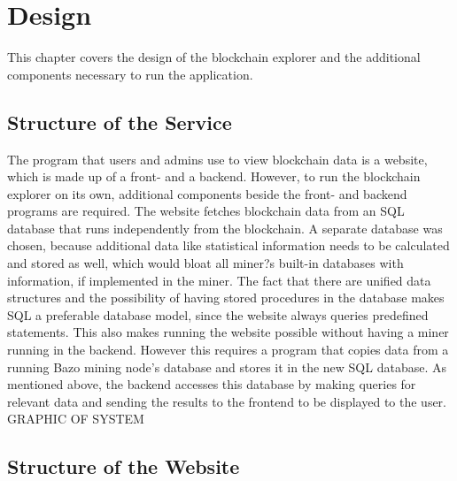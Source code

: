 \chapter{Design} \label{chap:design}
This chapter covers the design of the blockchain explorer and the additional components necessary to run the application.

\section{Structure of the Service}
The program that users and admins use to view blockchain data is a website, which is made up of a front- and a backend. However, to run the blockchain explorer on its own, additional components beside the front- and backend programs are required. The website fetches blockchain data from an SQL database that runs independently from the blockchain. A separate database was chosen, because additional data like statistical information needs to be calculated and stored as well, which would bloat all miner?s built-in databases with information, if implemented in the miner. The fact that there are unified data structures and the possibility of having stored procedures in the database makes SQL a preferable database model, since the website always queries predefined statements. This also makes running the website possible without having a miner running in the backend. However this requires a program that copies data from a running Bazo mining node's database and stores it in the new  SQL database. As mentioned above, the backend accesses this database by making queries for relevant data and sending the results to the frontend to be displayed to the user.
GRAPHIC OF SYSTEM
\section{Structure of the Website}
